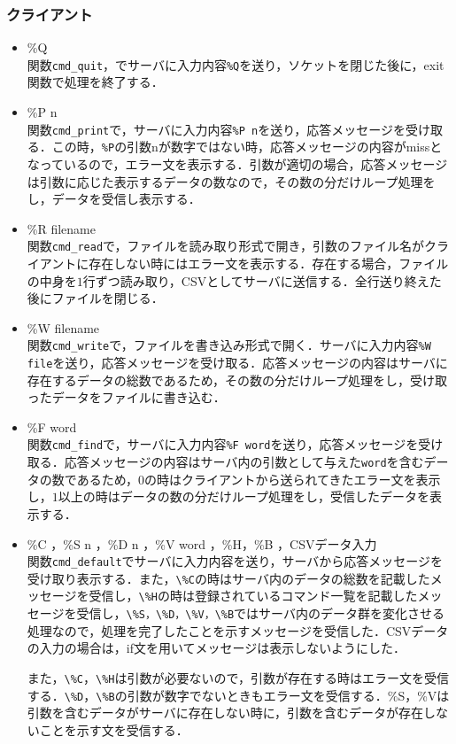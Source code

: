 \documentclass{jarticle}[11pt]
\begin{document}
\subsubsection{クライアント}
\begin{itemize}
\item \%Q \\
  関数\verb|cmd_quit|，でサーバに入力内容\verb|%Q|を送り，ソケットを閉じた後に，exit関数で処理を終了する．

\item \%P n \\
  関数\verb|cmd_print|で，サーバに入力内容\verb|%P n|を送り，応答メッセージを受け取る．この時，\verb|%P|の引数nが数字ではない時，応答メッセージの内容がmissとなっているので，エラー文を表示する．引数が適切の場合，応答メッセージは引数に応じた表示するデータの数なので，その数の分だけループ処理をし，データを受信し表示する．

\item \%R filename \\
関数\verb|cmd_read|で，ファイルを読み取り形式で開き，引数のファイル名がクライアントに存在しない時にはエラー文を表示する．存在する場合，ファイルの中身を$1$行ずつ読み取り，CSVとしてサーバに送信する．全行送り終えた後にファイルを閉じる．

\item \%W filename \\
関数\verb|cmd_write|で，ファイルを書き込み形式で開く．サーバに入力内容\verb|%W file|を送り，応答メッセージを受け取る．応答メッセージの内容はサーバに存在するデータの総数であるため，その数の分だけループ処理をし，受け取ったデータをファイルに書き込む．

\item \%F word \\
関数\verb|cmd_find|で，サーバに入力内容\verb|%F word|を送り，応答メッセージを受け取る．応答メッセージの内容はサーバ内の引数として与えた\verb|word|を含むデータの数であるため，$0$の時はクライアントから送られてきたエラー文を表示し，$1$以上の時はデータの数の分だけループ処理をし，受信したデータを表示する．

\item \%C ，\%S n ，\%D n ，\%V word ，\%H，\%B ，CSVデータ入力\\
  関数\verb|cmd_default|でサーバに入力内容を送り，サーバから応答メッセージを受け取り表示する．また，\verb|\%C|の時はサーバ内のデータの総数を記載したメッセージを受信し，\verb|\%H|の時は登録されているコマンド一覧を記載したメッセージを受信し，\verb|\%S，\%D，\%V，\%B|ではサーバ内のデータ群を変化させる処理なので，処理を完了したことを示すメッセージを受信した．CSVデータの入力の場合は，if文を用いてメッセージは表示しないようにした．

また，\verb|\%C|，\verb|\%H|は引数が必要ないので，引数が存在する時はエラー文を受信する．\verb|\%D|，\verb|\%B|の引数が数字でないときもエラー文を受信する．\%S，\%Vは引数を含むデータがサーバに存在しない時に，引数を含むデータが存在しないことを示す文を受信する．

\end{itemize}
\end{document}
